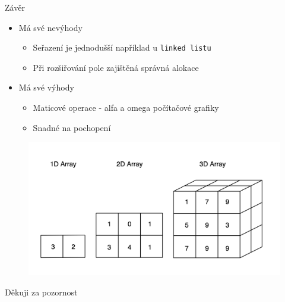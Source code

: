 \documentclass[10pt, hyperref={unicode}]{beamer}
\begin{document}
\begin{frame}{Závěr}
\begin{itemize}
    \item Má své nevýhody
        \begin{itemize}
            \item Seřazení je jednodušší například u \texttt{linked listu}
            \item Při rozšiřování pole zajištěná správná alokace
        \end{itemize}
    \item Má své výhody
        \begin{itemize}
            \item Maticové operace - alfa a omega počítačové grafiky
            \item Snadné na pochopení
        \end{itemize}
\end{itemize}
\begin{figure}
    \centering
    \includegraphics[scale=0.15]{arraytypes.png}
\end{figure}
\end{frame}

\begin{frame}{Děkuji za pozornost}
\end{frame}
\end{document}
